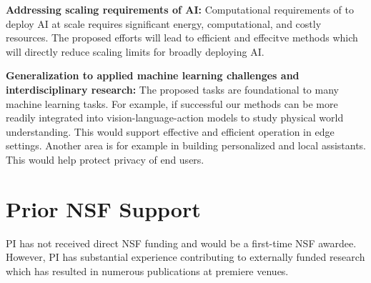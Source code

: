 \noindent\textbf{Addressing scaling requirements of AI: } Computational requirements of to deploy AI at scale requires significant energy, computational, and costly resources. The proposed efforts will lead to efficient and effecitve methods which will directly reduce scaling limits for broadly deploying AI. 

\noindent\textbf{Generalization to applied machine learning challenges and interdisciplinary research: } The proposed tasks are foundational to many machine learning tasks.  For example, if successful our methods can be more readily integrated into vision-language-action \cite{zitkovich2023rt} models to study physical world understanding. This would support effective and efficient operation in edge settings. Another area is for example in building personalized and local assistants. This would help protect privacy of end users.

\section*{Prior NSF Support}

PI has not received direct NSF funding and would be a first-time NSF awardee. However, PI has substantial experience contributing to externally funded research which has resulted in numerous publications at premiere venues.
